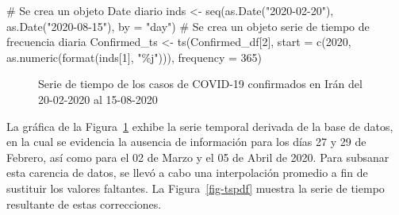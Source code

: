 \documentclass[
  us-letterpaper,
]{scrreprt}
\newenvironment{Shaded}{\begin{snugshade}}{\end{snugshade}}
\newcommand{\AttributeTok}[1]{\textcolor[rgb]{0.40,0.45,0.13}{#1}}
\newcommand{\CommentTok}[1]{\textcolor[rgb]{0.37,0.37,0.37}{#1}}
\newcommand{\DecValTok}[1]{\textcolor[rgb]{0.68,0.00,0.00}{#1}}
\newcommand{\FunctionTok}[1]{\textcolor[rgb]{0.28,0.35,0.67}{#1}}
\newcommand{\NormalTok}[1]{\textcolor[rgb]{0.00,0.23,0.31}{#1}}
\newcommand{\OtherTok}[1]{\textcolor[rgb]{0.00,0.23,0.31}{#1}}
\newcommand{\StringTok}[1]{\textcolor[rgb]{0.13,0.47,0.30}{#1}}
\theoremstyle{plain}
\theoremstyle{definition}
\theoremstyle{plain}
\theoremstyle{definition}
\theoremstyle{remark}
\begin{document}
\begin{Shaded}
\begin{Highlighting}[]
\CommentTok{\# Se crea un objeto \textquotesingle{}Date\textquotesingle{} diario}
\NormalTok{inds }\OtherTok{\textless{}{-}} \FunctionTok{seq}\NormalTok{(}\FunctionTok{as.Date}\NormalTok{(}\StringTok{"2020{-}02{-}20"}\NormalTok{), }\FunctionTok{as.Date}\NormalTok{(}\StringTok{"2020{-}08{-}15"}\NormalTok{), }\AttributeTok{by =} \StringTok{"day"}\NormalTok{)}
\CommentTok{\# Se crea un objeto \textquotesingle{}serie de tiempo\textquotesingle{} de frecuencia diaria}
\NormalTok{Confirmed\_ts }\OtherTok{\textless{}{-}} \FunctionTok{ts}\NormalTok{(Confirmed\_df[}\DecValTok{2}\NormalTok{], }
                   \AttributeTok{start =} \FunctionTok{c}\NormalTok{(}\DecValTok{2020}\NormalTok{, }\FunctionTok{as.numeric}\NormalTok{(}\FunctionTok{format}\NormalTok{(inds[}\DecValTok{1}\NormalTok{], }\StringTok{"\%j"}\NormalTok{))),}
                   \AttributeTok{frequency =} \DecValTok{365}\NormalTok{)}
\end{Highlighting}
\end{Shaded}

\begin{figure}


\caption{\label{fig-oripdf}Serie de tiempo de los casos de COVID-19
confirmados en Irán del 20-02-2020 al 15-08-2020}

\end{figure}%

La gráfica de la Figura~\ref{fig-oripdf} exhibe la serie temporal
derivada de la base de datos, en la cual se evidencia la ausencia de
información para los días 27 y 29 de Febrero, así como para el 02 de
Marzo y el 05 de Abril de 2020. Para subsanar esta carencia de datos, se
llevó a cabo una interpolación promedio a fin de sustituir los valores
faltantes. La Figura~\ref{fig-tspdf} muestra la serie de tiempo
resultante de estas correcciones.
\end{document}
